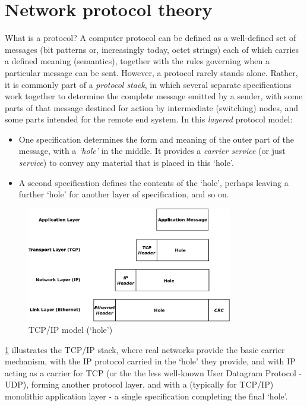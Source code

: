 \documentclass[times, utf8, diplomski]{fer}
\begin{document}
\section{Network protocol theory}
What is a protocol? A computer protocol can be defined as a well-defined set of messages (bit patterns or, increasingly today, octet strings) each of which carries a defined meaning (semantics), together with the rules governing when a particular message can be sent. 
However, a protocol rarely stands alone. 
Rather, it is commonly part of a \emph{protocol stack}, in which several separate specifications work together to determine the complete message emitted by a sender, with some parts of that message destined for action by intermediate (switching) nodes, and some parts intended for the remote end system.
In this \emph{layered} protocol model:
\begin{itemize}
  \item One specification determines the form and meaning of the outer part of the message, 
  with a \emph{`hole'} in the middle. It provides a \emph{carrier service} (or just \emph{service}) to convey any material that is placed in this `hole'.
  \item A second specification defines the contents of the `hole', perhaps leaving a further `hole' for another layer of specification, and so on. 
\end{itemize}
\begin{figure}[htb]
\begin{center}
\leavevmode
\includegraphics[width=0.8\textwidth]{tcp_ip_model_hole}
\end{center}
\caption{TCP/IP model (`hole')}
\label{fig:tcp_ip_model_hole}
\end{figure}
\ref{fig:tcp_ip_model_hole} illustrates the TCP/IP stack, where real networks provide the basic carrier mechanism, with the IP protocol carried in the `hole' they provide, and with IP acting as a carrier for TCP (or the the less well-known User Datagram Protocol - UDP), forming another protocol layer, and with a (typically for TCP/IP) monolithic application layer - a single specification completing the final `hole'. 
\end{document}
